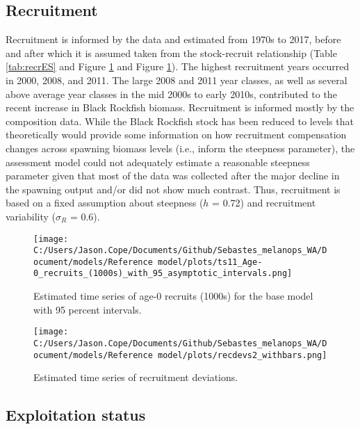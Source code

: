 \documentclass[11pt,
  letterpaper,
]{article}
\begin{document}
\clearpage

\hypertarget{recruitment}{%
\subsection*{Recruitment}\label{recruitment}}

Recruitment is informed by the data and estimated from 1970s to 2017, before and after which it is assumed taken from the stock-recruit relationship (Table \ref{tab:recrES} and Figure \ref{fig:es-recruits} and Figure \ref{fig:es-recruits}). The highest recruitment years occurred in 2000, 2008, and 2011. The large 2008 and 2011 year classes, as well as several above average year classes in the mid 2000s to early 2010s, contributed to the recent increase in Black Rockfish biomass. Recruitment is informed mostly by the composition data. While the Black Rockfish stock has been reduced to levels that theoretically would provide some information on how recruitment compensation changes across spawning biomass levels (i.e., inform the steepness parameter), the assessment model could not adequately estimate a reasonable steepness parameter given that most of the data was collected after the major decline in the spawning output and/or did not show much contrast. Thus, recruitment is based on a fixed assumption about steepness (\(h\) = 0.72) and recruitment variability (\(\sigma_R\) = 0.6).



\begin{figure}
{\centering
\texttt{[image: C:/Users/Jason.Cope/Documents/Github/Sebastes\_melanops\_WA/Document/models/Reference model/plots/ts11\_Age-0\_recruits\_(1000s)\_with\_95\_asymptotic\_intervals.png]}
}
\caption{Estimated time series of age-0 recruits (1000s) for the base model with 95 percent intervals.\label{fig:es-recruits}}
\end{figure}

\begin{figure}
{\centering
\texttt{[image: C:/Users/Jason.Cope/Documents/Github/Sebastes\_melanops\_WA/Document/models/Reference model/plots/recdevs2\_withbars.png]}
}
\caption{Estimated time series of recruitment deviations.\label{fig:es-recdev}}
\end{figure}
\clearpage

\hypertarget{exploitation-status}{%
\subsection*{Exploitation status}\label{exploitation-status}}
\end{document}
